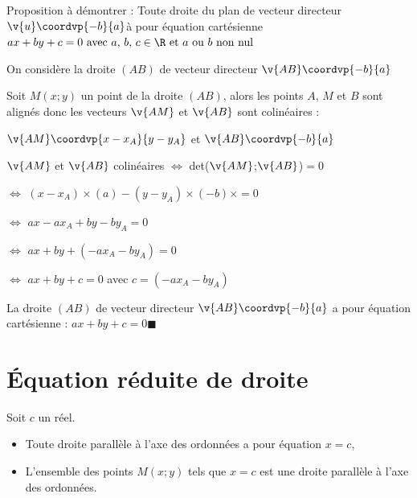 \begin{deme}{}{}
Proposition à démontrer : \og Toute droite du plan de vecteur directeur $\v{u} \coordvp{-b}{a}$à pour équation cartésienne $ax+by+c=0 \text{ avec $a$, $b$, $c \in \R$ et $a$ ou $b$ non nul}$ 

\medskip
\noindent On considère la droite $(AB)$ de vecteur directeur $\v{AB} \coordvp{-b}{a}$

\noindent Soit $M(x;y)$ un point de la droite $(AB)$, alors les points $A$, $M$ et $B$ sont alignés donc les vecteurs $\v{AM}$ et $\v{AB}$ sont colinéaires :

\medskip
\hspace{30mm}$\v{AM}\coordvp{x-x_A}{y-y_A}$ \hspace{20mm} et \hspace{20mm} $\v{AB}\coordvp{-b}{a}$

\medskip
\noindent \hspace{30mm}$\v{AM}$ et $\v{AB}$ colinéaires \quad $\Longleftrightarrow$ \quad det($\v{AM}$;$\v{AB}$)$=0$

\noindent {} \quad $\Longleftrightarrow$ \quad $(x-x_A)\times(a) - (y-y_A)\times (-b)\times=0$

\noindent {} \quad $\Longleftrightarrow$ \quad $ax-ax_A + by-by_A =0$

\noindent {} \quad $\Longleftrightarrow$ \quad $ax +by + (-ax_A-by_A)=0$

\noindent {} \quad $\Longleftrightarrow$ \quad $ax +by + c=0$ \hspace{2cm}avec $c = (-ax_A-by_A)$

\medskip
\noindent La droite $(AB)$ de vecteur directeur $\v{AB} \coordvp{-b}{a}$ a pour équation cartésienne : $ax + by + c = 0$\hfill $\blacksquare$
\end{deme}

\section{Équation réduite de droite}

\begin{prop}{}{}
   Soit $c$ un réel.
   \begin{itemize}
      \item  Toute droite parallèle à l'axe des ordonnées a pour équation $x =c$,
      \item  L'ensemble des points $M(x;y)$ tels que $x =c$ est une droite parallèle à l'axe des ordonnées.
   \end{itemize}
\end{prop}

